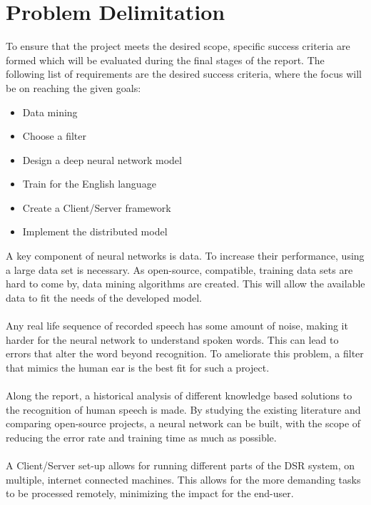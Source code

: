 
\section{Problem Delimitation}
To ensure that the project meets the desired scope,
specific success criteria are formed which will be
evaluated during the final stages of the report.
The following list of requirements are the desired
success criteria, where the focus will be on reaching
the given goals:
\begin{itemize}
	\item Data mining
	\item Choose a filter
	\item Design a deep neural network model
	\item Train for the English language
	\item Create a Client/Server framework
	\item Implement the distributed model
\end{itemize}
A key component of neural networks is data. To increase their performance, using a large data set is necessary. As open-source, compatible, training data sets are hard to come by, data mining algorithms are created. This will allow the available data to fit the needs of the developed model.\\\\
Any real life sequence of recorded speech has some amount of noise, making it harder for the neural network to understand spoken words.
This can lead to errors that alter the word beyond recognition. 
To ameliorate this problem, a filter that mimics the human
ear is the best fit for such a project.\\\\
Along the report, a historical analysis of different knowledge
based solutions to the recognition of human speech is made.
By studying the existing literature and comparing open-source projects, a neural network can be built, with the scope of reducing the error rate and training time as much
as possible.\\\\
A Client/Server set-up allows for running different parts of the DSR system, on multiple, internet connected machines. This allows for the more demanding tasks to be processed remotely, minimizing the impact for the end-user.

